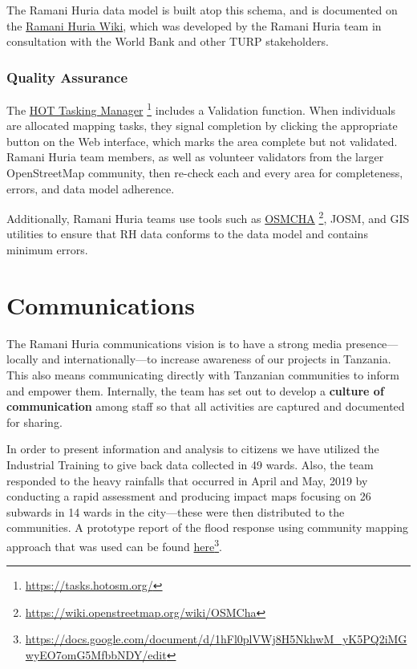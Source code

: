 \documentclass[a4paper,12pt,twoside]{article}
\begin{document}
The Ramani Huria data model is built atop this schema, and is documented on the \href{https://wiki.openstreetmap.org/wiki/Dar_es_Salaam/Ramani_Huria}{Ramani Huria Wiki}, which was developed by the Ramani Huria team in consultation with the World Bank and other TURP stakeholders. 

\subsubsection{Quality Assurance}
The \href{https://tasks.hotosm.org/}{HOT Tasking Manager} \footnote{\url{https://tasks.hotosm.org/}} includes a Validation function. When individuals are allocated mapping tasks, they signal completion by clicking the appropriate button on the Web interface, which marks the area complete but not validated. Ramani Huria team members, as well as volunteer validators from the larger OpenStreetMap community, then re-check each and every area for completeness, errors, and data model adherence.

Additionally, Ramani Huria teams use tools such as \href{https://wiki.openstreetmap.org/wiki/OSMCha}{OSMCHA} \footnote{\url{https://wiki.openstreetmap.org/wiki/OSMCha}}, JOSM, and GIS utilities to ensure that RH data conforms to the data model and contains minimum errors.

\newpage
\section{Communications}
The Ramani Huria communications vision is to have a strong media presence---locally and internationally---to increase awareness of our projects in Tanzania. This also means communicating directly with Tanzanian communities to inform and empower them. Internally, the team has set out to develop a \textbf{culture of communication} among staff so that all activities are captured and documented for sharing.

In order to present information and analysis to citizens we have utilized the Industrial Training to give back data collected in 49 wards. Also, the team responded to the heavy rainfalls that occurred in April and May, 2019 by conducting a rapid assessment and producing impact maps focusing on 26 subwards in 14 wards in the city—these were then distributed to the communities. A prototype report of the flood response using community mapping approach that was used can be found \href{https://docs.google.com/document/d/1hFl0plVWj8H5NkhwM_yK5PQ2iMGwyEO7omG5MfbbNDY/edit}{here}\footnote{\url{https://docs.google.com/document/d/1hFl0plVWj8H5NkhwM_yK5PQ2iMGwyEO7omG5MfbbNDY/edit}}.
\end{document}

